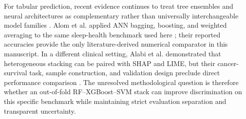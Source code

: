 \documentclass{elektr}
\begin{document}
For tabular prediction, recent evidence continues to treat tree ensembles and neural architectures as complementary rather than universally interchangeable model families \cite{borisov2024}. Alom et al. applied ANN bagging, boosting, and weighted averaging to the same sleep-health benchmark used here \cite{alom2024}; their reported accuracies provide the only literature-derived numerical comparator in this manuscript. In a different clinical setting, Alabi et al. demonstrated that heterogeneous stacking can be paired with SHAP and LIME, but their cancer-survival task, sample construction, and validation design preclude direct performance comparison \cite{alabi2023}. The unresolved methodological question is therefore whether an out-of-fold RF--XGBoost--SVM stack can improve discrimination on this specific benchmark while maintaining strict evaluation separation and transparent uncertainty.
\end{document}

